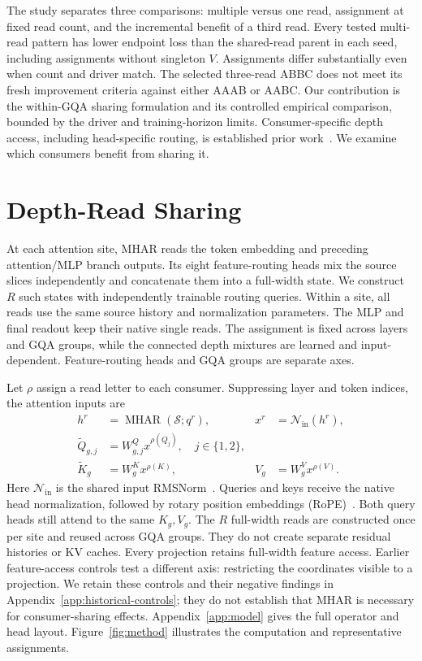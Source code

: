 \documentclass[11pt,letterpaper]{article}
\newcommand{\route}[1]{\textsf{#1}}
\begin{document}
The study separates three comparisons: multiple versus one read, assignment
at fixed read count, and the incremental benefit of a third read.
Every tested multi-read pattern has lower endpoint loss than the shared-read
parent in each seed, including assignments without singleton $V$.
Assignments differ substantially even when count and driver match.
The selected three-read \route{ABBC} does not meet its fresh improvement
criteria against either \route{AAAB} or \route{AABC}. Our contribution is the within-GQA sharing
formulation and its controlled empirical comparison, bounded by the driver
and training-horizon limits. Consumer-specific depth access, including
head-specific routing, is established prior
work~\cite{dca2025,dagformer2026}. %
We examine which consumers benefit from sharing it.

\section{Depth-Read Sharing}
\label{sec:method}
At each attention site, MHAR reads the token embedding and preceding
attention/MLP branch outputs. Its eight feature-routing heads mix the source
slices independently and concatenate them into a full-width state. We
construct $R$ such states with independently trainable routing queries.
Within a site, all reads use the same source history and normalization parameters.
The MLP and final readout keep their native single reads.
The assignment is fixed across layers and GQA groups, while the connected
depth mixtures are learned and input-dependent. Feature-routing heads and
GQA groups are separate axes.

Let $\rho$ assign a read letter to each consumer. Suppressing layer and
token indices, the attention inputs are
\begin{align}
 h^r &= \operatorname{MHAR}(\mathcal S;q^r),
 &x^r&=\mathcal N_{\mathrm{in}}(h^r),\\
 \widetilde Q_{g,j}&=W^Q_{g,j}x^{\rho(Q_j)},\quad j\in\{1,2\},\\
 \widetilde K_g&=W^K_gx^{\rho(K)},
 &V_g&=W^V_gx^{\rho(V)}.
 \label{eq:sharing-inputs}
\end{align}
Here $\mathcal N_{\mathrm{in}}$ is the shared input RMSNorm~\cite{rmsnorm2019}. %
Queries and keys receive the native head normalization, followed by
rotary position embeddings (RoPE)~\cite{roformer2024}. %
Both query heads still attend to the same $K_g,V_g$.
The $R$ full-width reads are constructed once per site and reused across
GQA groups. They do not create separate residual histories or KV caches.
Every projection retains full-width feature access.
Earlier feature-access controls test a different axis: restricting the
coordinates visible to a projection. We retain these controls and their
negative findings in Appendix~\ref{app:historical-controls}; they do not
establish that MHAR is necessary for consumer-sharing effects.
Appendix~\ref{app:model} gives the full operator and head layout.
Figure~\ref{fig:method} illustrates the computation and representative assignments.
\end{document}
